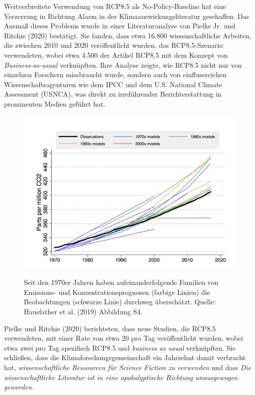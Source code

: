 \documentclass[12pt,paper=a4,DIV=12,parskip=never,chapterprefix=false,headings=standardclasses]{scrreprt}
\begin{document}
Weitverbreitete Verwendung von RCP8.5 als No-Policy-Baseline hat eine Verzerrung in Richtung Alarm in der Klimaauswirkungsliteratur geschaffen. Das Ausmaß dieses Problems wurde in einer Literaturanalyse von Pielke Jr. und Ritchie (2020) bestätigt. Sie fanden, dass etwa 16.800 wissenschaftliche Arbeiten, die zwischen 2010 und 2020 veröffentlicht wurden, das RCP8.5-Szenario verwendeten, wobei etwa 4.500 der Artikel RCP8.5 mit dem Konzept von \emph{Business-as-usual} verknüpften. Ihre Analyse zeigte, wie RCP8.5 nicht nur von einzelnen Forschern missbraucht wurde, sondern auch von einflussreichen Wissenschaftsagenturen wie dem IPCC und dem U.S. National Climate Assessment (USNCA), was direkt zu irreführender Berichterstattung in prominenten Medien geführt hat.

\begin{figure}[H]
\begin{center}
\includegraphics[width=1.0\textwidth]{bilder/bilderKlima-0011.png}\\[1cm]
\end{center}
\caption{Seit den 1970er Jahren haben aufeinanderfolgende Familien von Emissions- und Konzentrationsprognosen (farbige
Linien) die Beobachtungen (schwarze Linie) durchweg überschätzt. Quelle: Hausfather et al. (2019)
Abbildung S4.}
\end{figure}

Pielke und Ritchie (2020) berichteten, dass neue Studien, die RCP8.5 verwendeten, mit einer Rate von etwa 20 pro Tag veröffentlicht wurden, wobei etwa zwei pro Tag spezifisch RCP8.5 und \emph{business as usual} verknüpften. Sie schließen, dass die Klimaforschungsgemeinschaft ein Jahrzehnt damit verbracht hat, \emph{wissenschaftliche Ressourcen für Science Fiction zu verwenden} und dass \emph{Die wissenschaftliche Literatur ist in eine apokalyptische Richtung unausgewogen geworden.}
\end{document}
